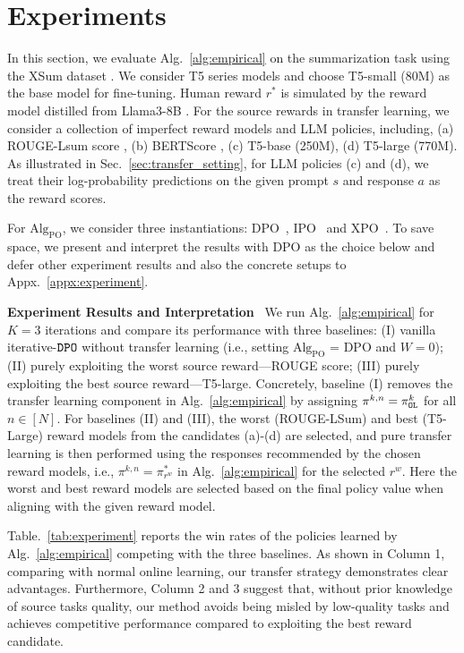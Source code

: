 \section{Experiments}\label{sec:experiment}
In this section, we evaluate Alg.~\ref{alg:empirical} on the summarization task using the XSum dataset \citep{Narayan2018DontGM}.
We consider T5 series models \citep{raffel2020exploring} and choose T5-small (80M) as the base model for fine-tuning.
Human reward $r^*$ is simulated by the reward model \citep{dong2405rlhf} distilled from Llama3-8B \citep{dubey2024llama}.
For the source rewards in transfer learning, we consider a collection of imperfect reward models and LLM policies, including, (a) ROUGE-Lsum score \citep{lin2004rouge}, (b) BERTScore \citep{zhang2019bertscore}, (c) T5-base (250M), (d) T5-large (770M).
As illustrated in Sec.~\ref{sec:transfer_setting}, for LLM policies (c) and (d), we treat their log-probability predictions on the given prompt $s$ and response $a$ as the reward scores.

For $\text{Alg}_{\text{PO}}$, we consider three instantiations: DPO~\citep{rafailov2024direct}, IPO~\citep{azar2024general} and XPO~\citep{xie2024exploratory}.
To save space, we present and interpret the results with DPO as the choice below and defer other experiment results and also the concrete setups to Appx.~\ref{appx:experiment}.

\textbf{Experiment Results and Interpretation}~
We run Alg.~\ref{alg:empirical} for $K=3$ iterations and compare its performance with three baselines: (I) vanilla iterative-${\texttt{DPO}}$ without transfer learning (i.e., setting $\text{Alg}_{\text{PO}}$ = DPO and $W = 0$); (II) purely exploiting the worst source reward---ROUGE score; (III) purely exploiting the best source reward---T5-large.
Concretely, baseline (I) removes the transfer learning component in Alg.~\ref{alg:empirical} by assigning $\pi^{k,n} = \pi_{\texttt{OL}}^k$ for all $n\in[N]$.
For baselines (II) and (III), the worst (ROUGE-LSum) and best (T5-Large) reward models from the candidates (a)-(d) are selected, and pure transfer learning is then performed using the responses recommended by the chosen reward models, i.e., $\pi^{k,n} = \pi^*_{r^w}$ in Alg.~\ref{alg:empirical} for the selected $r^w$.
Here the worst and best reward models are selected based on the final policy value when aligning with the given reward model.

Table.~\ref{tab:experiment} reports the win rates of the policies learned by Alg.~\ref{alg:empirical} competing with the three baselines.
As shown in Column 1, comparing with normal online learning, our transfer strategy demonstrates clear advantages.
Furthermore, Column 2 and 3 suggest that, without prior knowledge of source tasks quality, our method avoids being misled by low-quality tasks and achieves competitive performance compared to exploiting the best reward candidate.

